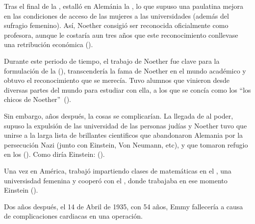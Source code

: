 Tras el final de la , estalló en Alemánia la , lo que supuso una paulatina mejora en las condiciones de acceso de las mujeres a las universidades (además del sufragio femenino).
Así, Noether consigió ser reconocida oficialmente como profesora, aunque le costaría aun tres años que este reconocimiento conllevase una retribución económica (\cite[333]{Carrasco}).

Durante este periodo de tiempo, el trabajo de Noether fue clave para la formulación de la  (\cite{Weyl}), transcendería la fama de Noether en el mundo académico y obtuvo el reconocimiento que se merecía.
Tuvo alumnos que vinieron desde diversas partes del mundo para estudiar con ella, a los que se concía como los \textquotedblleft los chicos de Noether\textquotedblright\ (\cite{Carrasco}).

Sin embargo, años después, la cosas se complicarían.
La llegada de  al poder, supuso la expulsión de las universidad de las personas judías y Noether tuvo que unirse a la larga lista de brillantes cientificos que abandonaron Alemania por la persecución Nazi (junto con Einstein, Von Neumann, etc), y que tomaron refugio en los  (\cite{Kimberling}).
Como diría Einstein:  (\cite{Einstein}).

Una vez en América, trabajó impartiendo clases de matemáticas en el , una universisdad femenina y cooperó con el , donde trabajaba en ese momento Einstein (\cite{Carrasco}).

Dos años después, el 14 de Abril de 1935, con 54 años, Emmy fallecería a causa de complicaciones cardiacas en una operación.
